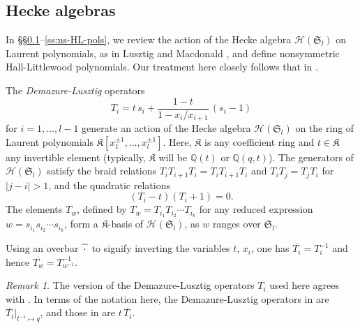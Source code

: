 \documentclass[12pt]{amsart}
\theoremstyle{definition}
\theoremstyle{remark}
\newtheorem{remark}[thm]{Remark}
\newcommand{\QQ}{{\mathbb Q}}
\newcommand{\Kfrak}{{\mathfrak K}}
\newcommand{\Sfrak}{{\mathfrak S}}
\newcommand{\Hcal}{{\mathcal H}}
\begin{document}
\subsection{Hecke algebras}
\label{ss:hecke}

In \S \S \ref{ss:hecke}--\ref{ss:ns-HL-pols}, we review the action of
the Hecke algebra $\Hcal (\Sfrak _{l})$ on Laurent polynomials, as in
Lusztig \cite{Lusztig83,Lusztig89} and Macdonald \cite{Macdonald03},
and define nonsymmetric Hall-Littlewood polynomials.  Our treatment
here closely follows that in \cite[\S \S 4.2--4.3]{BHMPS23}.

The \emph{Demazure-Lusztig} operators
\begin{equation}\label{e:Ti}
T_{i} = t\, s_{i} +\frac{1-t}{1-x_{i}/x_{i+1}}\, (s_{i}-1)
\end{equation}
for $i = 1,\dots, l-1$ generate an action of the Hecke algebra $\Hcal
(\Sfrak _{l})$ on the ring of Laurent polynomials $\Kfrak[x_{1}^{\pm
1},\ldots,x_{l}^{\pm 1}]$.  Here, $\Kfrak$ is any coefficient ring and
$t \in \Kfrak$ any invertible element (typically, $\Kfrak$ will be
$\QQ(t)$ or $\QQ(q,t)$).  The generators of $\Hcal (\Sfrak _{l})$
satisfy the braid relations $T_{i}T_{i+1}T_{i} = T_{i}T_{i+1}T_{i}$
and $T_{i}T_{j} = T_{j}T_{i}$ for $|j-i|>1$, and the quadratic
relations
\begin{equation}\label{e:quadratic-Hecke-rels}
(T_{i}- t)(T_{i}+1) = 0.
\end{equation}
The elements $T_w$, defined by $T_w = T_{i_1} T_{i_2}\cdots T_{i_k}$
for any reduced expression $w=s_{i_1}s_{i_2}\cdots s_{i_k}$, form a
$\Kfrak$-basis of $\Hcal (\Sfrak _{l})$, as $w$ ranges over
$\Sfrak_l$. 

Using an overbar $\overline{\, \vphantom{t} \cdot \, }$ to signify
inverting the variables $t$, $x_{i}$, one has $\overline{T_{i}} =
T_{i}^{-1}$ and hence $\overline{T_{w}} = T_{w^{-1}}^{-1}$.

\begin{remark}\label{rem: Ti conventions}
The version of the Demazure-Lusztig operators $T_{i}$ used here agrees
with \cite{Goodberry24,HagHaiLo08, Lapointe22}.  In terms of the
notation here, the Demazure-Lusztig operators in \cite{BHMPS25a,
BHMPS23} are $\overline{T_{i}}|_{t^{-1}\mapsto q}$, and those in
\cite{BechtloffWeising23} are $t\, \overline{T_{i}}$.
\end{remark}
\end{document}
